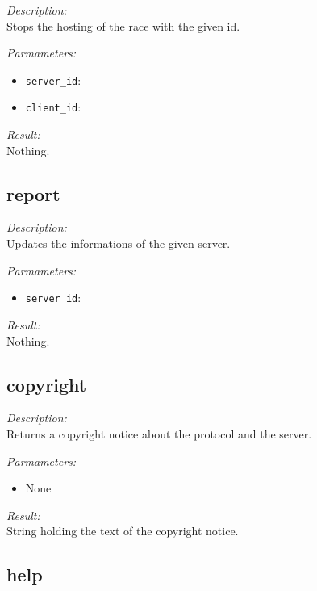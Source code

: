 \begin{description}
\item {\it Description:}\\
Stops the hosting of the race with the given id.
\item {\it Parmameters:}
\begin{itemize}
\item {\tt server\_id}: 
\item {\tt client\_id}: 
\end{itemize}
\item {\it Result:}\\
Nothing.
\end{description}

\subsection{report}

\begin{description}
\item {\it Description:}\\
Updates the informations of the given server.
\item {\it Parmameters:}
\begin{itemize}
\item {\tt server\_id}: 
\end{itemize}
\item {\it Result:}\\
Nothing.
\end{description}

\subsection{copyright}

\begin{description}
\item {\it Description:}\\
Returns a copyright notice about the protocol and the server.
\item {\it Parmameters:}
\begin{itemize}
\item None
\end{itemize}
\item {\it Result:}\\
String holding the text of the copyright notice.
\end{description}

\subsection{help}

